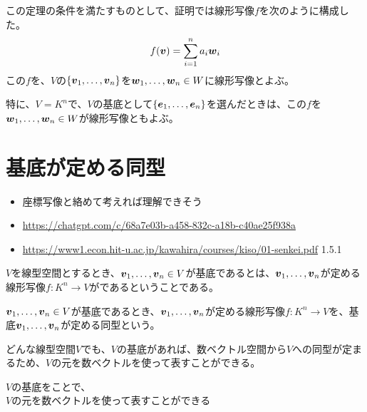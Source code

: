 \documentclass[../../../topic_linear-algebra]{subfiles}
\begin{document}
この定理の条件を満たすものとして、証明では線形写像$f$を次のように構成した。
\begin{equation*}
  f(\vb*{v}) = \sum_{i=1}^{n} a_i \vb*{w}_i
\end{equation*}
この$f$を、$V$の$\{ \vb*{v}_1, \ldots, \vb*{v}_n \}$を$\vb*{w}_1, \ldots, \vb*{w}_n \in W$に線形写像とよぶ。

\br

特に、$V = K^n$で、$V$の基底として$\{ \vb*{e}_1, \ldots, \vb*{e}_n \}$を選んだときは、この$f$を$\vb*{w}_1, \ldots, \vb*{w}_n \in W$が線形写像ともよぶ。

\sectionline
\section{基底が定める同型}

\begin{mindflow}
  \begin{itemize}
    \item 座標写像と絡めて考えれば理解できそう
    \item \url{https://chatgpt.com/c/68a7e03b-a458-832c-a18b-c40ae25f938a}
    \item \url{https://www1.econ.hit-u.ac.jp/kawahira/courses/kiso/01-senkei.pdf} 1.5.1
  \end{itemize}
\end{mindflow}

$V$を線型空間とするとき、$\vb*{v}_1, \ldots, \vb*{v}_n \in V$が基底であるとは、$\vb*{v}_1, \ldots, \vb*{v}_n$が定める線形写像$f\colon K^n \to V$がであるということである。

\br

$\vb*{v}_1, \ldots, \vb*{v}_n \in V$が基底であるとき、$\vb*{v}_1, \ldots, \vb*{v}_n$が定める線形写像$f\colon K^n \to V$を、基底$\vb*{v}_1, \ldots, \vb*{v}_n$が定める同型という。

\br

どんな線型空間$V$でも、$V$の基底があれば、数ベクトル空間から$V$への同型が定まるため、$V$の元を数ベクトルを使って表すことができる。

\begin{emphabox}
  \begin{spacebox}
    \begin{center}
      $V$の基底をことで、\\
      $V$の元を数ベクトルを使って表すことができる
    \end{center}
  \end{spacebox}
\end{emphabox}
\end{document}
